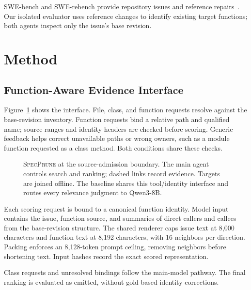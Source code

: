 \documentclass{svproc}
\newcommand{\specprune}{\textsc{SpecPrune}}
\begin{document}
SWE-bench and SWE-rebench provide repository issues and reference repairs~\cite{swebench2024,swerebench2025}. Our isolated evaluator uses reference changes to identify existing target functions; both agents inspect only the issue's base revision.

\section{Method}
\subsection{Function-Aware Evidence Interface}
Figure~\ref{fig:architecture} shows the interface. File, class, and function requests resolve against the base-revision inventory. Function requests bind a relative path and qualified name; source ranges and identity headers are checked before scoring. Generic feedback helps correct unavailable paths or wrong owners, such as a module function requested as a class method. Both conditions share these checks.

\begin{figure}[t]
\centering

\caption{\specprune{} at the source-admission boundary. The main agent controls search and ranking; dashed links record evidence. Targets are joined offline. The baseline shares this tool/identity interface and routes every relevance judgment to Qwen3-8B.}
\label{fig:architecture}
\end{figure}

Each scoring request is bound to a canonical function identity. Model input contains the issue, function source, and summaries of direct callers and callees from the base-revision structure. The shared renderer caps issue text at 8,000 characters and function text at 8,192 characters, with 16 neighbors per direction. Packing enforces an 8,128-token prompt ceiling, removing neighbors before shortening text. Input hashes record the exact scored representation.

Class requests and unresolved bindings follow the main-model pathway. The final ranking is evaluated as emitted, without gold-based identity corrections.
\end{document}
